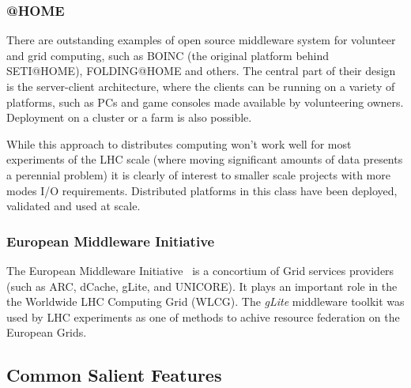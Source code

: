 \subsubsection{@HOME}
There are outstanding examples of open source middleware system for volunteer and grid computing, such as BOINC (the original platform behind SETI@HOME), FOLDING@HOME and others.
The central part of their design is the server-client architecture, where the clients can be running on a variety of platforms, such as PCs and game consoles made available by volunteering
owners. Deployment on a cluster or a farm is also possible.

While this approach to distributes computing won't work well for most experiments of the LHC scale (where moving significant amounts of data presents a perennial problem) it is clearly of
interest to smaller scale projects with more modes I/O requirements. Distributed platforms in this class have been deployed, validated and used at scale.

\subsubsection{European Middleware Initiative}
The European Middleware Initiative~\cite{emi} is a concortium of Grid services providers (such as ARC, dCache, gLite, and UNICORE).
It plays an important role in the the Worldwide LHC Computing Grid (WLCG). The \textit{gLite} middleware toolkit was used by LHC experiments as one of methods
to achive resource federation on the European Grids. 

\subsection{Common Salient Features}

